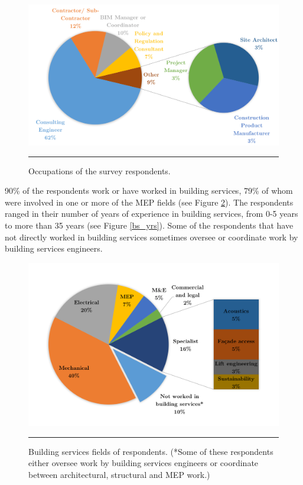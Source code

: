 \begin{figure}[htbp]
	\centering
	\includegraphics[width=\textwidth]{figures/positions.png}
	\rule{\textwidth}{0.5pt} %
	\caption{Occupations of the survey respondents.}
	\label{positions}
\end{figure}



90\% of the respondents work or have worked in building services, 79\% of whom were involved in one or more of the MEP fields (see Figure \ref{bs_fields}).
The respondents ranged in their number of years of experience in building services, from 0-5 years to more than 35 years (see Figure \ref{bs_yrs}).
Some of the respondents that have not directly worked in building services sometimes oversee or coordinate work by building services engineers.

\begin{figure}[htbp]
	\centering
	\includegraphics[width=\textwidth]{figures/BS-fields.png}
	\rule{\textwidth}{0.5pt} %
	\caption[Building services fields of respondents.]{Building services fields of respondents. (*Some of these respondents either oversee work by building services engineers or coordinate between architectural, structural and MEP work.)}
	\label{bs_fields}
\end{figure}



